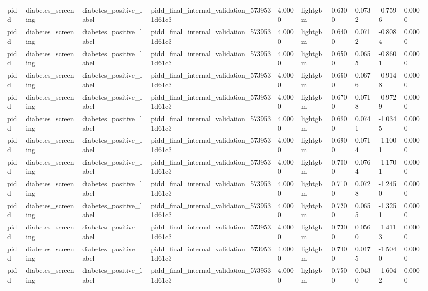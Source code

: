 \begin{tabular}{llllllllll}
pidd & diabetes\_screening & diabetes\_positive\_label & pidd\_final\_internal\_validation\_5739531d61c3 & 4.0000 & lightgbm & 0.6300 & 0.0732 & -0.7596 & 0.0000 \\
pidd & diabetes\_screening & diabetes\_positive\_label & pidd\_final\_internal\_validation\_5739531d61c3 & 4.0000 & lightgbm & 0.6400 & 0.0712 & -0.8084 & 0.0000 \\
pidd & diabetes\_screening & diabetes\_positive\_label & pidd\_final\_internal\_validation\_5739531d61c3 & 4.0000 & lightgbm & 0.6500 & 0.0655 & -0.8601 & 0.0000 \\
pidd & diabetes\_screening & diabetes\_positive\_label & pidd\_final\_internal\_validation\_5739531d61c3 & 4.0000 & lightgbm & 0.6600 & 0.0676 & -0.9148 & 0.0000 \\
pidd & diabetes\_screening & diabetes\_positive\_label & pidd\_final\_internal\_validation\_5739531d61c3 & 4.0000 & lightgbm & 0.6700 & 0.0718 & -0.9729 & 0.0000 \\
pidd & diabetes\_screening & diabetes\_positive\_label & pidd\_final\_internal\_validation\_5739531d61c3 & 4.0000 & lightgbm & 0.6800 & 0.0741 & -1.0345 & 0.0000 \\
pidd & diabetes\_screening & diabetes\_positive\_label & pidd\_final\_internal\_validation\_5739531d61c3 & 4.0000 & lightgbm & 0.6900 & 0.0714 & -1.1001 & 0.0000 \\
pidd & diabetes\_screening & diabetes\_positive\_label & pidd\_final\_internal\_validation\_5739531d61c3 & 4.0000 & lightgbm & 0.7000 & 0.0764 & -1.1701 & 0.0000 \\
pidd & diabetes\_screening & diabetes\_positive\_label & pidd\_final\_internal\_validation\_5739531d61c3 & 4.0000 & lightgbm & 0.7100 & 0.0728 & -1.2450 & 0.0000 \\
pidd & diabetes\_screening & diabetes\_positive\_label & pidd\_final\_internal\_validation\_5739531d61c3 & 4.0000 & lightgbm & 0.7200 & 0.0655 & -1.3251 & 0.0000 \\
pidd & diabetes\_screening & diabetes\_positive\_label & pidd\_final\_internal\_validation\_5739531d61c3 & 4.0000 & lightgbm & 0.7300 & 0.0560 & -1.4113 & 0.0000 \\
pidd & diabetes\_screening & diabetes\_positive\_label & pidd\_final\_internal\_validation\_5739531d61c3 & 4.0000 & lightgbm & 0.7400 & 0.0475 & -1.5040 & 0.0000 \\
pidd & diabetes\_screening & diabetes\_positive\_label & pidd\_final\_internal\_validation\_5739531d61c3 & 4.0000 & lightgbm & 0.7500 & 0.0430 & -1.6042 & 0.0000 \\

\end{tabular}
